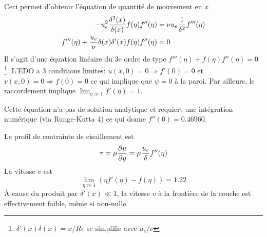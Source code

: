     Ceci permet d'obtenir l'équation de quantité de mouvement en $x$
    \begin{equation}
      \begin{aligned}
        -u_e^2 \frac{\delta^2(x)}{\delta(x)} f(\eta) f''(\eta) &= \nu u_e \frac{1}{\delta^2} f'''(\eta)\\
        f'''(\eta) + \frac{u_e}{\nu}\delta(x)\delta'(x) f(\eta) f''(\eta) &= 0
      \end{aligned}
    \end{equation}
    Il s'agit d'une équation linéaire du 3e ordre de type $f'''(\eta) + f(\eta)f''(\eta) = 0$\footnote{$\delta'(x)\delta(x) = x/Re$ se simplifie avec $u_e/\nu$}. L'EDO a 3 conditions limites: $u(x, 0) = 0 \Rightarrow f'(0) = 0$ et $v(x, 0) = 0 \Rightarrow f(0) = 0$ ce qui implique que $\psi = 0$ à la paroi. Par ailleurs, le raccordement implique $\lim_{\eta \gg 1} f'(\eta) = 1$.

    Cette équation n'a pas de solution analytique et requiert une intégration numérique (via Runge-Kutta 4) ce qui donne $f''(0) = 0.46960$.

    Le profil de contrainte de cisaillement est
    \begin{equation}
      \tau = \mu \pdv{u}{y} = \mu\frac{u_e}{\delta}f''(\eta)
    \end{equation}
    La vitesse $v$ est
    \begin{equation}
      \lim_{\eta \gg 1} (\eta f'(\eta) - f(\eta)) = 1.22
    \end{equation}
    À cause du produit par $\delta'(x) \ll 1$, la vitesse $v$ à la frontière de la couche est effectivement faible, même si non-nulle.

